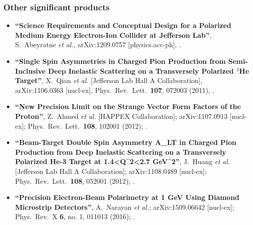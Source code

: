 
\subsubsection*{Other significant products}
\begin{itemize}
 \setlength{\itemsep}{0pt}
 \setlength{\parskip}{0pt}
 \setlength{\parsep}{0pt}
 
 \item%
  {\bf ``Science Requirements and Conceptual Design for a Polarized Medium Energy Electron-Ion Collider at Jefferson Lab''},
  S.~Abeyratne {\it et al.},
  arXiv:1209.0757 [physics.acc-ph],
  \cite{Abeyratne:2012ah}.

 \item%
  {\bf ``Single Spin Asymmetries in Charged Pion Production from Semi-Inclusive Deep Inelastic Scattering on a Transversely Polarized $^3$He Target''},
  X.~Qian {\it et al.} [Jefferson Lab Hall A Collaboration],
  arXiv:1106.0363 [nucl-ex],
  Phys.\ Rev.\ Lett.\  {\bf 107}, 072003 (2011),
  \cite{PhysRevLett.107.072003}.

 \item%
  {\bf ``New Precision Limit on the Strange Vector Form Factors of the Proton''},
  Z.~Ahmed {\it et al.} [HAPPEX Collaboration];
  arXiv:1107.0913 [nucl-ex];
  Phys.\ Rev.\ Lett.\  {\bf 108}, 102001 (2012);
  \cite{PhysRevLett.108.102001}.

 \item%
  {\bf ``Beam-Target Double Spin Asymmetry A\_LT in Charged Pion Production from Deep Inelastic Scattering on a Transversely Polarized He-3 Target at 1.4<Q\textasciicircum{}2<2.7 GeV\textasciicircum{}2''},
  J.~Huang {\it et al.} [Jefferson Lab Hall A Collaboration];
  arXiv:1108.0489 [nucl-ex];
  Phys.\ Rev.\ Lett.\  {\bf 108}, 052001 (2012);
  \cite{PhysRevLett.108.052001}.

 \item%
  {\bf ``Precision Electron-Beam Polarimetry at 1 GeV Using Diamond Microstrip Detectors''},
  A.~Narayan {\it et al.};
  arXiv:1509.06642 [nucl-ex];
  Phys.\ Rev.\ X {\bf 6}, no. 1, 011013 (2016);
  \cite{Narayan:2015aua}.

\end{itemize}

